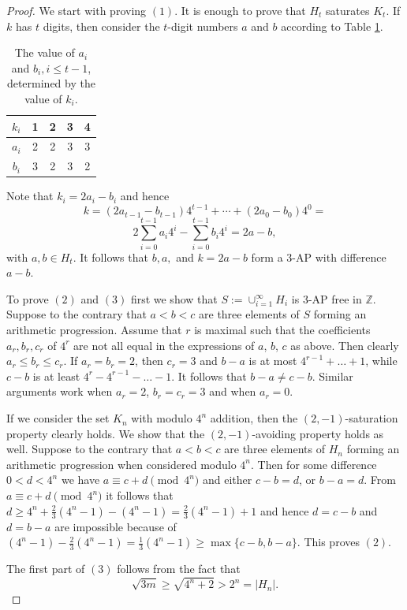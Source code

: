 \documentclass[11pt]{article}
\numberwithin{table}{section}
\theoremstyle{definition}
\begin{document}
	\begin{proof}
		We start with proving $(1)$. It is enough to prove that $H_t$ saturates $K_t$. 
		If $k$ has $t$ digits, then consider the $t$-digit numbers $a$ and $b$ according to Table \ref{tab:my_label1}.
		
		\begin{table}[h!!]
			\centering
			\begin{tabular}{c||c|c|c|c|}
				$k_i$   & 1 & 2 & 3 & 4\\ \hline
				$a_i$  & 2 & 2 & 3 & 3 \\ \hline
				$b_i$  & 3 & 2 & 3 & 2
			\end{tabular}
			\caption{The value of $a_i$ and $b_i, i\leq t-1$, determined by the value of $k_i$.}
			\label{tab:my_label1}
		\end{table}
		
		Note that $k_i=2a_i-b_i$ and hence 
		\[k=(2a_{t-1}-b_{t-1})4^{t-1}+\cdots +(2a_0-b_0) 4^0=\]
		\[2 \sum_{i=0}^{t-1} a_{i}4^i - \sum_{i=0}^{t-1} b_i 4^i=2a-b,\]
		with $a,b \in H_t$. It follows that $b, a,$ and $ k=2a-b$ form a $3$-$\mathrm{AP}$ with difference $a-b$. 
		
		To prove $(2)$ and $(3)$ first we show that $S:=\cup_{i=1}^{\infty} H_i$ is $3$-$\mathrm{AP}$ free in $\mathbb{Z}$.
		Suppose to the contrary that $a<b<c$ are three elements of $S$ forming an arithmetic progression. Assume that $r$ is maximal such that the coefficients $a_r,b_r,c_r$ of $4^r$ are not all equal in the expressions of $a$, $b$, $c$ as above. Then clearly $a_r\leq b_r \leq c_r$. 
		If $a_r=b_r=2$, then $c_r=3$ and $b-a$ is at most $4^{r-1}+\ldots+1$, while $c-b$ is at least $4^r-4^{r-1}-\ldots-1$. It follows that $b-a \neq c-b$. Similar arguments work when $a_r=2$, $b_r=c_r=3$ and when $a_r=0$.
		
		If we consider the set $K_n$ with modulo $4^n$ addition, then  the $(2,-1)$-saturation property clearly holds. We show that the  $(2,-1)$-avoiding property  holds as well. Suppose to the contrary that $a<b<c$ are three elements of $H_n$ forming an arithmetic progression when considered modulo $4^n$.
		Then for some difference $0<d<4^n$ we have $a\equiv c+d \pmod {4^n}$ and 
		either $c-b=d$, or $b-a=d$. 
		From $a\equiv c+d \pmod {4^n}$ it follows that 
		$d \geq 4^n+\frac23(4^n-1)-(4^n-1)=\frac23(4^n-1)+1$ and hence $d=c-b$ and $d=b-a$ are impossible because of $(4^n-1)-\frac23(4^n-1)=\frac13(4^n-1) \geq \max\{c-b,b-a\}$. This proves $(2)$.
		
		The first part of $(3)$ follows from the fact that 
		\[\sqrt{3m}\geq \sqrt{4^n+2}>2^n=|H_n|.\]
		

\end{proof}
\end{document}
